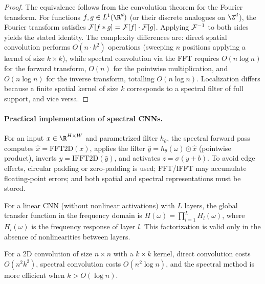 \begin{proof}
The equivalence follows from the convolution theorem for the Fourier transform.
For functions $f, g \in L^1(\R^d)$ (or their discrete analogues on $\Z^d$), the
Fourier transform satisfies $\mathcal{F}[f * g] = \mathcal{F}[f] \cdot \mathcal{F}[g]$. Applying
$\mathcal{F}^{-1}$ to both sides yields the stated identity. The complexity differences
are: direct spatial convolution performs $O(n \cdot k^2)$ operations (sweeping
$n$ positions applying a kernel of size $k \times k$), while spectral
convolution via the FFT requires $O(n \log n)$ for the forward transform, $O(n)$
for the pointwise multiplication, and $O(n \log n)$ for the inverse transform,
totalling $O(n \log n)$. Localization differs because a finite spatial kernel of
size $k$ corresponds to a spectral filter of full support, and vice versa.
\end{proof}

\paragraph{Practical implementation of spectral CNNs.}
For an input $x \in \R^{H \times W}$ and parametrized filter $h_\theta$, the
spectral forward pass computes $\hat{x} = \mathrm{FFT2D}(x)$, applies the filter
$\hat{y} = h_\theta(\omega) \odot \hat{x}$ (pointwise product), inverts
$y = \mathrm{IFFT2D}(\hat{y})$, and activates $z = \sigma(y + b)$. To avoid edge
effects, circular padding or zero-padding is used; FFT/IFFT may accumulate
floating-point errors; and both spatial and spectral representations must be
stored.

\begin{definition}
\label{def:grids:transfer-function}
For a linear CNN (without nonlinear activations) with $L$ layers, the global
transfer function in the frequency domain is
$H(\omega) = \prod_{l=1}^L H_l(\omega)$, where $H_l(\omega)$ is the frequency
response of layer $l$. This factorization is valid only in the absence of
nonlinearities between layers.
\end{definition}

\begin{theorem}
\label{thm:grids:complexity}
For a 2D convolution of size $n \times n$ with a $k \times k$ kernel, direct
convolution costs $O(n^2 k^2)$, spectral convolution costs $O(n^2 \log n)$, and
the spectral method is more efficient when $k > O(\log n)$.
\end{theorem}

